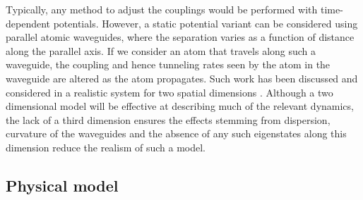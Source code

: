 Typically, any method to adjust the couplings would be performed with time-dependent potentials. However, a static potential variant can be considered using parallel atomic waveguides, where the separation varies as a function of distance along the parallel axis. If we consider an atom that travels along such a waveguide, the coupling and hence tunneling rates seen by the atom in the waveguide are altered as the atom propagates. Such work has been discussed and considered in a realistic system for two spatial dimensions \cite{OSullivan:10}. Although a two dimensional model will be effective at describing much of the relevant dynamics, the lack of a third dimension ensures the effects stemming from dispersion, curvature of the waveguides and the absence of any such eigenstates along this dimension reduce the realism of such a model.

\subsection{Physical model}


